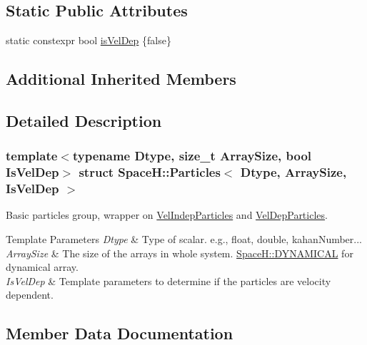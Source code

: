 \subsection*{Static Public Attributes}
\begin{DoxyCompactItemize}
\item 
static constexpr bool \mbox{\hyperlink{struct_space_h_1_1_particles_a0e288210d4c5cfabd19648afd3e79912}{is\+Vel\+Dep}} \{false\}
\end{DoxyCompactItemize}
\subsection*{Additional Inherited Members}


\subsection{Detailed Description}
\subsubsection*{template$<$typename Dtype, size\+\_\+t Array\+Size, bool Is\+Vel\+Dep$>$\newline
struct Space\+H\+::\+Particles$<$ Dtype, Array\+Size, Is\+Vel\+Dep $>$}

Basic particles group, wrapper on \mbox{\hyperlink{class_space_h_1_1_vel_indep_particles}{Vel\+Indep\+Particles}} and \mbox{\hyperlink{class_space_h_1_1_vel_dep_particles}{Vel\+Dep\+Particles}}. 


\begin{DoxyTemplParams}{Template Parameters}
{\em Dtype} & Type of scalar. e.\+g., float, double, kahan\+Number... \\
\hline
{\em Array\+Size} & The size of the arrays in whole system. \mbox{\hyperlink{namespace_space_h_a3e55b9bc2a9e10c08ce8121bce11244a}{Space\+H\+::\+D\+Y\+N\+A\+M\+I\+C\+AL}} for dynamical array. \\
\hline
{\em Is\+Vel\+Dep} & Template parameters to determine if the particles are velocity dependent. \\
\hline
\end{DoxyTemplParams}


\subsection{Member Data Documentation}
\mbox{\label{struct_space_h_1_1_particles_a0e288210d4c5cfabd19648afd3e79912}} 
